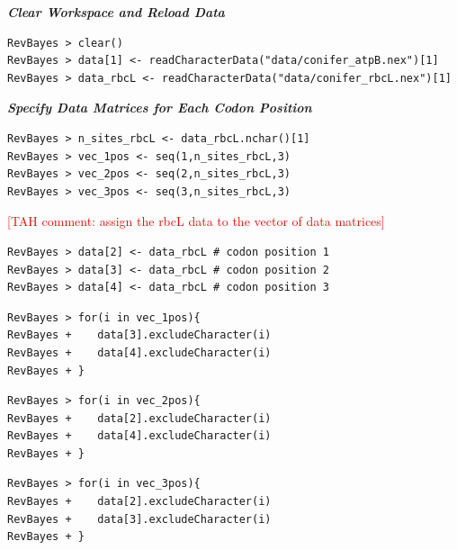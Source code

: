 \documentclass[11pt]{article}
\newcommand{\taha}[1]{{\textcolor{red}{[TAH comment: #1]}}} %
\begin{document}
\textbf{\textit{Clear Workspace and Reload Data}}

{\tt \begin{snugshade*}
\begin{lstlisting}
RevBayes > clear()
RevBayes > data[1] <- readCharacterData("data/conifer_atpB.nex")[1]
RevBayes > data_rbcL <- readCharacterData("data/conifer_rbcL.nex")[1]
\end{lstlisting}
\end{snugshade*}}

\textbf{\textit{Specify Data Matrices for Each Codon Position}}

{\tt \begin{snugshade*}
\begin{lstlisting}
RevBayes > n_sites_rbcL <- data_rbcL.nchar()[1]
RevBayes > vec_1pos <- seq(1,n_sites_rbcL,3)
RevBayes > vec_2pos <- seq(2,n_sites_rbcL,3)
RevBayes > vec_3pos <- seq(3,n_sites_rbcL,3)
\end{lstlisting}
\end{snugshade*}}

\taha{assign the rbcL data to the vector of data matrices}
{\tt \begin{snugshade*}
\begin{lstlisting}
RevBayes > data[2] <- data_rbcL	# codon position 1
RevBayes > data[3] <- data_rbcL	# codon position 2
RevBayes > data[4] <- data_rbcL	# codon position 3
\end{lstlisting}
\end{snugshade*}}

{\tt \begin{snugshade*}
\begin{lstlisting}
RevBayes > for(i in vec_1pos){
RevBayes +    data[3].excludeCharacter(i) 
RevBayes +    data[4].excludeCharacter(i)
RevBayes + }
\end{lstlisting}
\end{snugshade*}}

{\tt \begin{snugshade*}
\begin{lstlisting}
RevBayes > for(i in vec_2pos){
RevBayes +    data[2].excludeCharacter(i) 
RevBayes +    data[4].excludeCharacter(i)
RevBayes + }
\end{lstlisting}
\end{snugshade*}}

{\tt \begin{snugshade*}
\begin{lstlisting}
RevBayes > for(i in vec_3pos){
RevBayes +    data[2].excludeCharacter(i) 
RevBayes +    data[3].excludeCharacter(i)
RevBayes + }
\end{lstlisting}
\end{snugshade*}}
\end{document}
